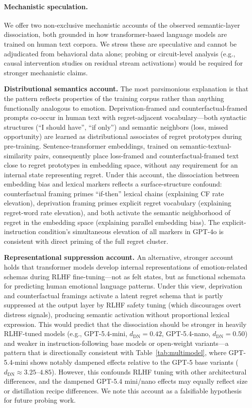 \documentclass[conference,10pt]{IEEEtran}
\begin{document}
\paragraph{Mechanistic speculation.}
We offer two non-exclusive mechanistic accounts of the observed semantic-layer dissociation, both grounded in how transformer-based language models are trained on human text corpora. We stress these are speculative and cannot be adjudicated from behavioral data alone; probing or circuit-level analysis (e.g., causal intervention studies on residual stream activations) would be required for stronger mechanistic claims.

\textbf{Distributional semantics account.} The most parsimonious explanation is that the pattern reflects properties of the training corpus rather than anything functionally analogous to emotion. Deprivation-framed and counterfactual-framed prompts co-occur in human text with regret-adjacent vocabulary---both syntactic structures (``I should have'', ``if only'') and semantic neighbors (loss, missed opportunity) are learned as distributional associates of regret prototypes during pre-training. Sentence-transformer embeddings, trained on semantic-textual-similarity pairs, consequently place loss-framed and counterfactual-framed text close to regret prototypes in embedding space, without any requirement for an internal state representing regret. Under this account, the dissociation between embedding bias and lexical markers reflects a surface-structure confound: counterfactual framing primes ``if-then'' lexical chains (explaining CF rate elevation), deprivation framing primes explicit regret vocabulary (explaining regret-word rate elevation), and both activate the semantic neighborhood of regret in the embedding space (explaining parallel embedding bias). The explicit-instruction condition's simultaneous elevation of all markers in GPT-4o is consistent with direct priming of the full regret cluster.

\textbf{Representational suppression account.} An alternative, stronger account holds that transformer models develop internal representations of emotion-related schemas during RLHF fine-tuning---not as felt states, but as functional schemata for predicting human emotional language patterns. Under this view, deprivation and counterfactual framings activate a latent regret schema that is partly suppressed at the output layer by RLHF safety tuning (which discourages overt distress signals), producing semantic activation without proportional lexical expression. This would predict that the dissociation should be stronger in heavily RLHF-tuned models (e.g., GPT-5.4-mini, $d_\text{DN}=0.42$, GPT-5.4-nano, $d_\text{DN}=0.50$) and weaker in instruction-following base models or open-weight variants---a pattern that is directionally consistent with Table~\ref{tab:multimodel}, where GPT-5.4-mini shows notably dampened effects relative to the GPT-5 base variants ($d_\text{DN}\approx3.25$--$4.85$). However, this confounds RLHF tuning with other architectural differences, and the dampened GPT-5.4 mini/nano effects may equally reflect size or distillation recipe differences. We note this account as a falsifiable hypothesis for future probing work.
\end{document}
